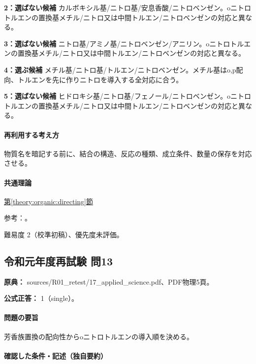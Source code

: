 \noindent\textbf{2：選ばない候補} カルボキシル基/ニトロ基/安息香酸/ニトロベンゼン。oニトロトルエンの置換基メチル/ニトロ又は中間トルエン/ニトロベンゼンの対応と異なる。\par

\noindent\textbf{3：選ばない候補} ニトロ基/アミノ基/ニトロベンゼン/アニリン。oニトロトルエンの置換基メチル/ニトロ又は中間トルエン/ニトロベンゼンの対応と異なる。\par

\noindent\textbf{4：選ぶ候補} メチル基/ニトロ基/トルエン/ニトロベンゼン。メチル基はo,p配向、トルエンを先に作りニトロを導入する全対応に合う。\par

\noindent\textbf{5：選ばない候補} ヒドロキシ基/ニトロ基/フェノール/ニトロベンゼン。oニトロトルエンの置換基メチル/ニトロ又は中間トルエン/ニトロベンゼンの対応と異なる。\par

\paragraph{再利用する考え方} 物質名を暗記する前に、結合の構造、反応の種類、成立条件、数量の保存を対応させる。

\paragraph{共通理論} \hyperref[theory:organic:directing]{第\ref*{theory:organic:directing}節}

\par 参考：\cite{organic_directing}。

\par 難易度 2（校準初稿）、優先度未評価。

\subsection{令和元年度再試験 問13}
\label{q:r01-ret-applied-13}

\noindent\textbf{原典：} sources/R01\_retest/17\_applied\_science.pdf、PDF物理5頁。

\textbf{公式正答：} 1（single）。

\paragraph{問題の要旨} 芳香族置換の配向性からoニトロトルエンの導入順を決める。

\paragraph{確認した条件・記述（独自要約）}\mbox{}\par

